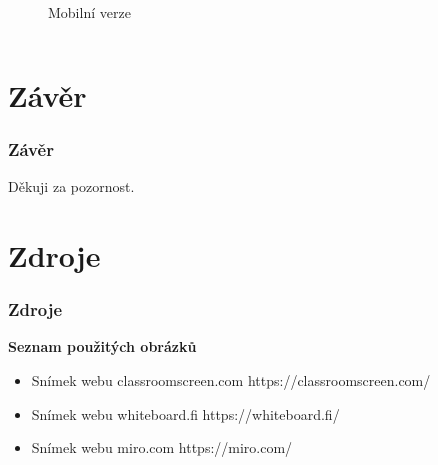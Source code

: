 \documentclass{beamer}
\begin{document}
\begin{frame}
\begin{columns}[T]
\begin{column}{.33\textwidth}
\begin{figure}
    	           \caption{Mobilní verze}
            \end{figure}
        \end{column}
    \end{columns}
\end{frame}



\section{Závěr}
\begin{frame}
    \frametitle{Závěr}
\center Děkuji za pozornost.
\end{frame}



\section{Zdroje}
\begin{frame}
    \frametitle{Zdroje}
    {\large\textbf{Seznam použitých obrázků}}
    \begin{itemize}
        \item Snímek webu classroomscreen.com
        \newline
        \noindent https://classroomscreen.com/
        \item Snímek webu whiteboard.fi
        \newline
        \noindent https://whiteboard.fi/
        \item Snímek webu miro.com
        \newline
        \noindent https://miro.com/
    \end{itemize}
\end{frame}
\end{document}
